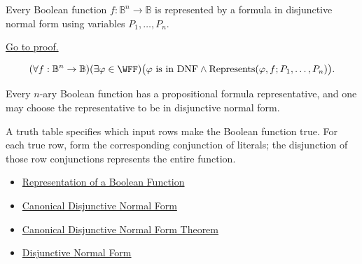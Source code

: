 \begin{tcolorbox}[colback=thmbox, colframe=thmborder, arc=2pt,
  left=6pt, right=6pt, top=4pt, bottom=4pt,
  title={\small\textbf{Theorem (DNF Representation of Boolean Functions)}},
  fonttitle=\small\bfseries]
\begin{theorem}
\label{thm:dnf-representation-of-boolean-functions-propositional-logic}
Every Boolean function \(f:\mathbb{B}^n\to\mathbb{B}\) is represented by a
formula in disjunctive normal form using variables \(P_1,\ldots,P_n\).

\noindent\hyperref[prf:dnf-representation-of-boolean-functions-propositional-logic]{Go to proof.}
\end{theorem}
\end{tcolorbox}

\begin{remark*}
\[
(\forall f:\mathbb{B}^n\to\mathbb{B})(\exists\varphi\in\WFF)
\bigl(\varphi\text{ is in DNF}\land
\operatorname{Represents}(\varphi,f;P_1,\ldots,P_n)\bigr).
\]
\end{remark*}

\begin{remark*}
Every \(n\)-ary Boolean function has a propositional formula representative, and
one may choose the representative to be in disjunctive normal form.
\end{remark*}

\begin{remark*}[Interpretation]
A truth table specifies which input rows make the Boolean function true. For
each true row, form the corresponding conjunction of literals; the disjunction
of those row conjunctions represents the entire function.
\end{remark*}

\begin{dependencies}
\begin{itemize}
  \item \hyperref[def:boolean-function-representation-propositional-logic]{Representation of a Boolean Function}
  \item \hyperref[def:canonical-disjunctive-normal-form-propositional-logic]{Canonical Disjunctive Normal Form}
  \item \hyperref[thm:canonical-disjunctive-normal-form-propositional-logic]{Canonical Disjunctive Normal Form Theorem}
  \item \hyperref[def:disjunctive-normal-form-propositional-logic]{Disjunctive Normal Form}
\end{itemize}
\end{dependencies}
